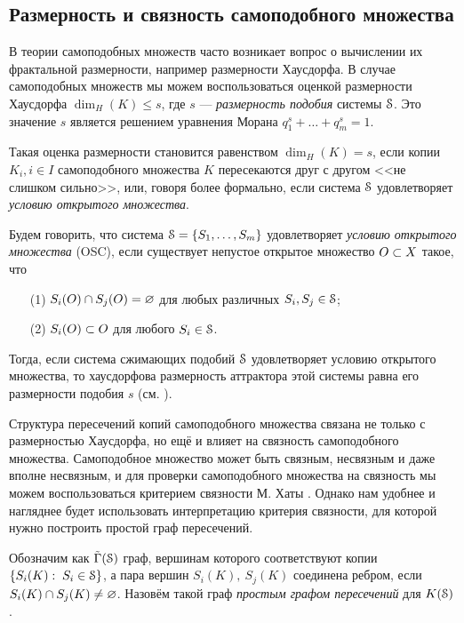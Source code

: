 \subsection{Размерность и связность самоподобного множества}

В теории самоподобных множеств часто возникает вопрос о вычислении их фрактальной размерности, например размерности Хаусдорфа.
В случае самоподобных множеств мы можем воспользоваться оценкой размерности Хаусдорфа $\dim_H(K)\leq s$, где $s$ --- {\em размерность подобия} системы ${\EuScript S}$.
Это значение $s$ является решением уравнения Морана $q_1^s+\ldots+q_m^s=1$.

Такая оценка размерности становится равенством $\dim_H(K)=s$, если копии ${K_i, i\in I}$ самоподобного множества $K$ пересекаются друг с другом <<не слишком сильно>>, или, говоря более формально, если система ${\EuScript S}$ удовлетворяет {\em условию открытого множества}. 

\begin{definition}\label{dfn:osc}
Будем говорить, что система ${\EuScript S}=\{S_1,\ldots,S_m\}$ удовлетворяет {\em условию открытого множества} (OSC), если существует непустое открытое множество $O \subset X$ такое, что
\begin{enumerate}[nolistsep]
\item[(1)] $S_i(O)\cap S_j(O)=\varnothing$ для любых различных $S_i,S_j\in{\EuScript S}$;
\item[(2)] $S_i(O)\subset O$ для любого $S_i\in{\EuScript S}$.
\end{enumerate}
\end{definition}

Тогда, если система сжимающих подобий ${\EuScript S}$ удовлетворяет условию открытого множества, то хаусдорфова размерность аттрактора этой системы равна его размерности подобия $s$ (см. \cite{Hut1981, Falconer2004}).

Структура пересечений копий самоподобного множества связана не только с размерностью Хаусдорфа, но ещё и влияет на связность самоподобного множества.
Самоподобное множество может быть связным, несвязным и даже вполне несвязным, и для проверки самоподобного множества на связность мы можем воспользоваться критерием связности М. Хаты \cite[Theorem 4.6]{Hata1985}.
Однако нам удобнее и нагляднее будет использовать интерпретацию критерия связности, для которой нужно построить простой граф пересечений.

\begin{definition}
Обозначим как $\tilde{\Gamma}({\EuScript S})$ граф, вершинам которого соответствуют копии $\{S_i(K):\; S_i\in {\EuScript S}\}$, а пара вершин $S_i(K),\ S_j(K)$ соединена ребром, если $S_i(K)\cap S_j(K)\neq\varnothing$.
Назовём такой граф {\em простым графом пересечений} для $K({\EuScript S})$.
\end{definition}

